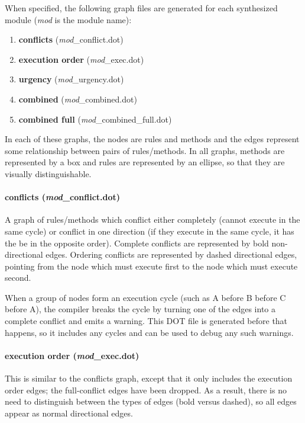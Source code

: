\documentclass{article}
\begin{document}
When specified, the following graph files are generated for each
synthesized module (\emph{mod} is the module name):
\begin{enumerate}
\item {\bf conflicts} (\emph{mod}\_conflict.dot)
\item {\bf execution order} (\emph{mod}\_exec.dot)
\item {\bf urgency} (\emph{mod}\_urgency.dot)
\item {\bf combined} (\emph{mod}\_combined.dot)
\item {\bf combined full} (\emph{mod}\_combined\_full.dot)
\end{enumerate}

In each of these graphs, the nodes are rules and methods and the edges
represent some relationship between pairs of rules/methods.  In all
graphs, methods are represented by a box and rules are represented by
an ellipse, so that they are visually distinguishable.

\paragraph{conflicts (\emph{mod}\_conflict.dot)}

A graph of rules/methods which conflict either completely (cannot execute
in the same cycle) or conflict in one direction (if they execute in the
same cycle, it has the be in the opposite order).  Complete conflicts are
represented by bold non-directional edges. Ordering conflicts are
represented by dashed directional edges, pointing from the node which must
execute first to the node which must execute second.

When a group of nodes form an execution cycle (such as A before B before C
before A), the compiler breaks the cycle by turning one of the edges into
a complete conflict and emits a warning.  This DOT file is generated before
that happens, so it includes any cycles and can be used to debug any such
warnings.

\paragraph{execution order (\emph{mod}\_exec.dot)}

This is similar to the conflicts graph, except that it only includes
the execution
order edges; the full-conflict edges have been dropped.  As a result,
there is no need to distinguish between the types of edges (bold versus
dashed), so all edges appear as normal directional edges.
\end{document}
